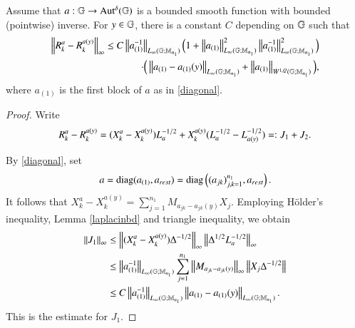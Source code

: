 \documentclass[leqno]{amsart}
\begin{document}
	\begin{proposition}\label{rieszquotient}
		Assume that $a:\mathbb{G}\rightarrow{\rm Aut^{\delta}}(\mathbb{G})$ is a bounded smooth function with bounded (pointwise) inverse. For $y\in\mathbb{G}$, there is a constant $C$ depending on $\mathbb{G}$ such that
		\begin{align*}
			\left\| { R}^{a}_{k}-{ R}^{a(y)}_{k} \right\|_{\infty}
			\leq C\left\| a_{(1)}^{-1} \right\|_{L_{\infty}(\mathbb{G};\mathbb{M}_{n_{1}})}\Big(1+\left\| a_{(1)} \right\|_{L_{\infty}(\mathbb{G};\mathbb{M}_{n_{1}})}^{2}\left\| a_{(1)}^{-1} \right\|_{L_{\infty}(\mathbb{G};\mathbb{M}_{n_{1}})}^{2}\Big)\\
			\cdot\Big(\left\| a_{(1)}-a_{(1)}(y) \right\|_{L_{\infty}(\mathbb{G};\mathbb{M}_{n_{1}})}+\left\| a_{(1)} \right\|_{\dot{W}^{1,Q}(\mathbb{G};\mathbb{M}_{n_{1}})}\Big),
		\end{align*}
		where $a_{(1)}$ is the first block of $a$ as in \eqref{diagonal}.
	\end{proposition}
	\begin{proof}
		Write
		\begin{align*}
			{ R}^{a}_{k}-{ R}^{a(y)}_{k}
			=(X_{k}^{a}-X_{k}^{a(y)})L_{a}^{-1/2}+X_{k}^{a(y)}(L_{a}^{-1/2}-L_{a(y)}^{-1/2})
			=:J_{1}+J_{2}.
		\end{align*}
		
		By \eqref{diagonal}, set
		\begin{align*}
			a={\rm diag}(a_{(1)},a_{rest})={\rm diag}\left((a_{jk})_{j,k=1}^{n_{1}},a_{rest}\right).
		\end{align*}
		It follows that $\displaystyle X_{k}^{a}-X_{k}^{a(y)}=\sum_{j=1}^{n_{1}}M_{a_{jk}-a_{jk}(y)}X_{j}$.
		Employing H\"{o}lder's inequality, Lemma \ref{laplacinbd} and triangle inequality, we obtain
		\begin{align*}
			\left\| J_{1} \right\|_{\infty}
			&\leq\left\| (X_{k}^{a}-X_{k}^{a(y)})\Delta^{-1/2} \right\|_{\infty}
			\left\| \Delta^{1/2}L_{a}^{-1/2} \right\|_{\infty}\\
			&\leq\left\| a_{(1)}^{-1} \right\|_{L_{\infty}(\mathbb{G};\mathbb{M}_{n_{1}})}\sum_{j=1}^{n_{1}}
			\left\| M_{a_{jk}-a_{jk}(y)} \right\|_{\infty}\left\| X_{j}\Delta^{-1/2} \right\|\\
			&\leq C\left\| a_{(1)}^{-1} \right\|_{L_{\infty}(\mathbb{G};\mathbb{M}_{n_{1}})}\left\| a_{(1)}-a_{(1)}(y) \right\|_{L_{\infty}(\mathbb{G};\mathbb{M}_{n_{1}})}.
		\end{align*}
		This is the estimate for $J_{1}$.
		

\end{proof}
\end{document}
